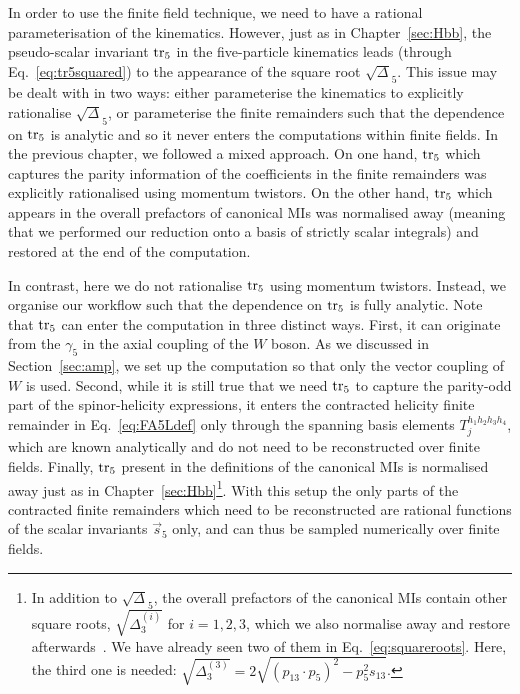 \documentclass[main.tex]{subfiles}
\begin{document}
In order to use the finite field technique, we need to have a rational parameterisation of the kinematics. However, just as in Chapter~\ref{sec:Hbb}, the pseudo-scalar invariant $\operatorname{\rm tr}_5$ in the five-particle kinematics leads (through Eq.~\eqref{eq:tr5squared}) to the appearance of the square root $\sqrt{\Delta}_5$. This issue may be dealt with in two ways: either parameterise the kinematics to explicitly rationalise $\sqrt{\Delta}_5$, or parameterise the finite remainders such that the dependence on $\operatorname{\rm tr}_5$ is analytic and so it never enters the computations within finite fields. In the previous chapter, we followed a mixed approach. On one hand, $\operatorname{\rm tr}_5$ which captures the parity information of the coefficients in the finite remainders was explicitly rationalised using momentum twistors. On the other hand, $\operatorname{\rm tr}_5$ which appears in the overall prefactors of canonical MIs was normalised away (meaning that we performed our reduction onto a basis of strictly scalar integrals) and restored at the end of the computation.

In contrast, here we do not rationalise $\operatorname{\rm tr}_5$ using momentum twistors. Instead, we organise our workflow such that the dependence on $\operatorname{\rm tr}_5$ is fully analytic. Note that $\operatorname{\rm tr}_5$ can enter the computation in three distinct ways. First, it can originate from the $\gamma_5$ in the axial coupling of the $W$ boson. As we discussed in Section~\ref{sec:amp}, we set up the computation so that only the vector coupling of $W$ is used. Second, while it is still true that we need $\operatorname{\rm tr}_5$ to capture the parity-odd part of the spinor-helicity expressions, it enters the contracted helicity finite remainder in Eq.~\eqref{eq:FA5Ldef} only through the spanning basis elements $T_{j}^{h_1 h_2 h_3 h_4}$, which are known analytically and do not need to be reconstructed over finite fields. Finally, $\operatorname{\rm tr}_5$ present in the definitions of the canonical MIs is normalised away just as in Chapter~\ref{sec:Hbb}\footnote{In addition to $\sqrt{\Delta}_5$, the overall prefactors of the canonical MIs contain other square roots, $\sqrt{\Delta_3^{(i)}}$ for $i=1,2,3$, which we also normalise away and restore afterwards~\cite{Abreu:2020jxa, Chicherin:2021dyp}. We have already seen two of them in Eq.~\ref{eq:squareroots}. Here, the third one is needed: $\sqrt{\Delta_3^{(3)}} = 2 \sqrt{(p_{13} \cdot p_{5})^2 - p_5^2 s_{13}}$.}. With this setup the only parts of the contracted finite remainders which need to be reconstructed are rational functions of the scalar invariants $\vec{s}_5$ only, and can thus be sampled numerically over finite fields.
\end{document}
